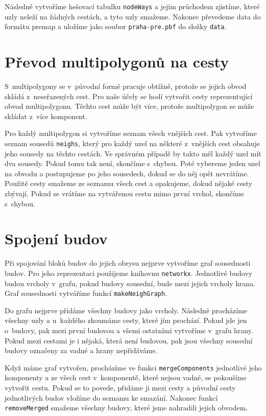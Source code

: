 Následně vytvoříme hešovací tabulku \verb|nodeWays| a jejím průchodem zjistíme, které
uzly neleží na žádných cestách, a tyto uzly smažeme. Nakonec převedeme data do
formátu premap a uložíme jako soubor \verb|praha-pre.pbf| do složky \verb|data|.

\section{Převod multipolygonů na cesty}
S~multipolygony se v~původní formě pracuje obtížně, protože se jejich obvod
skládá z~neseřazených cest. Pro naše účely se hodí vytvořit cesty reprezentující
obvod multipolygonu. Těchto cest může být více, protože multipolygon se může
skládat z~více komponent. 

Pro každý multipolygon si vytvoříme seznam všech vnějších cest. Pak vytvoříme
seznam sousedů \verb|neighs|, který pro každý uzel na některé z~vnějších cest
obsahuje jeho sousedy na těchto cestách. Ve správném případě by takto měl každý
uzel mít dva sousedy. Pokud tomu tak není, skončíme s~chybou. Poté vybereme
jeden uzel na obvodu a postupujeme po jeho sousedech, dokud se do něj opět
nevrátíme. Použité cesty smažeme ze seznamu všech cest a opakujeme, dokud nějaké
cesty zbývají. Pokud se vrátíme na vytvářenou cestu mimo první vrchol, skončíme
s~chybou.

\section{Spojení budov}
Při spojování bloků budov do jejich obrysu nejprve vytvoříme graf sousednosti
budov. Pro jeho reprezentaci použijeme knihovnu \verb|networkx|. Jednotlivé
budovy budou vrcholy v~grafu, pokud budovy sousední, bude mezi jejich vrcholy
hrana. Graf sousednosti vytváříme funkcí \verb|makeNeighGraph|.

Do grafu nejprve přidáme všechny budovy jako vrcholy. Následně procházíme
všechny uzly a u~každého zkoumáme cesty, které jím prochází. Pokud jde jen
o~budovy, pak mezi první budovou a všemi ostatními vytvoříme v~grafu hrany. Pokud
mezi cestami je i nějaká, která není budovou, pak jsou všechny sousední budovy
označeny za vadné a hrany nepřidáváme.

Když máme graf vytvořen, procházíme ve funkci \verb|mergeComponents| jednotlivé
jeho komponenty a ze všech cest v~komponentě, které nejsou vadné, se pokoušíme
vytvořit cestu. Pokud se to povede, přidáme ji mezi cesty a původní cesty
jednotlivých budov vložíme do seznamu ke smazání. Nakonec funkcí
\verb|removeMerged| smažeme všechny budovy, které jsme nahradili jejich obvodem.


